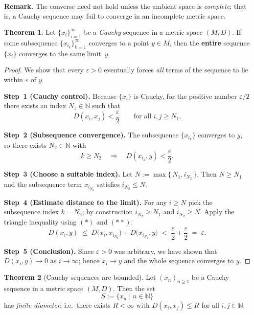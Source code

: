 \documentclass[12pt]{article}
\theoremstyle{definition} %
\newtheorem{theorem}{Theorem}
\theoremstyle{plain} %
\begin{document}
\medskip
\noindent
\textbf{Remark.}\; The converse need not hold unless the ambient space is
\emph{complete}; that is, a Cauchy sequence may fail to converge in an
incomplete metric space.

\begin{theorem}\label{thm:cauchy_subseq}
  Let $\{x_i\}_{i=1}^{\infty}$ be a \emph{Cauchy} sequence in a metric space $(M,D)$.  
  If some subsequence $\{x_{i_k}\}_{k=1}^{\infty}$ converges to a point $y\in M$,  
  then the \textbf{entire} sequence $\{x_i\}$ converges to the same limit~$y$.
\end{theorem}

\begin{proof}
  We show that every $\varepsilon>0$ eventually forces \emph{all} terms of the
  sequence to lie within $\varepsilon$ of $y$.

  \smallskip
  \textbf{Step 1 (Cauchy control).}
  Because $\{x_i\}$ is Cauchy, for the positive number $\varepsilon/2$
  there exists an index $N_1\in\mathbb N$ such that
  \[
      D(x_i,x_j)<\frac{\varepsilon}{2}
      \qquad\text{for all }i,j\ge N_1.
  \tag{$\ast$}
  \]

  \smallskip
  \textbf{Step 2 (Subsequence convergence).}
  The subsequence $\{x_{i_k}\}$ converges to $y$, 
  so there exists $N_2\in\mathbb N$ with
  \[
      k\ge N_2
      \quad\Longrightarrow\quad
      D(x_{i_k},y)<\frac{\varepsilon}{2}.
  \tag{$\ast\!\ast$}
  \]

  \smallskip
  \textbf{Step 3 (Choose a suitable index).}
  Let $N:=\max\{\,N_1,i_{N_2}\,\}$.  
  Then $N\ge N_1$ and the subsequence term $x_{i_{N_2}}$ satisfies $i_{N_2}\le N$.

  \smallskip
  \textbf{Step 4 (Estimate distance to the limit).}
  For any $i\ge N$ pick the subsequence index $k=N_2$; by construction $i_{N_2}\ge N_1$
  and $i_{N_2}\ge N$.  
  Apply the triangle inequality using $(\ast)$ and $(\ast\!\ast)$:
  \[
      D(x_i,y)
      \;\le\;
      D\bigl(x_i,x_{i_{N_2}}\bigr)+D\bigl(x_{i_{N_2}},y\bigr)
      \;<\;
      \frac{\varepsilon}{2}+\frac{\varepsilon}{2}
      \;=\;
      \varepsilon.
  \]

  \smallskip
  \textbf{Step 5 (Conclusion).}
  Since $\varepsilon>0$ was arbitrary, we have shown that
  $D(x_i,y)\to 0$ as $i\to\infty$; hence $x_i\to y$ and the whole
  sequence converges to $y$.
\end{proof}
\begin{theorem}[Cauchy sequences are bounded]\label{thm:cauchy_bounded}
  Let $(x_n)_{n\ge 1}$ be a Cauchy sequence in a metric space $(M,D)$.
  Then the set
  \[
      S:=\{x_n\mid n\in\mathbb N\}
  \]
  has \emph{finite diameter}; i.e.\ there exists $R<\infty$ with
  $D(x_i,x_j)\le R$ for all $i,j\in\mathbb N$.
\end{theorem}
\end{document}

